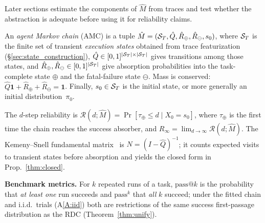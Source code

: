 Later sections estimate the components of $\hat M$ from traces and test
whether the abstraction is adequate before using it for reliability
claims.

\begin{definition}\label{def:amc}
An \emph{agent Markov chain} (AMC) is a tuple
$\hat M=(\mathcal{S}_T,\hat Q,\hat R_\oplus,\hat R_\ominus,s_0)$, where $\mathcal{S}_T$ is
the finite set of transient \emph{execution states} obtained from trace
featurization (\S\ref{sec:state_construction}),
$\hat Q\in[0,1]^{|\mathcal{S}_T|\times|\mathcal{S}_T|}$ gives transitions among those
states, and $\hat R_\oplus,\hat R_\ominus\in[0,1]^{|\mathcal{S}_T|}$ give
absorption probabilities into the task-complete state $\oplus$ and the
fatal-failure state $\ominus$. Mass is conserved:
$\hat Q\mathbf{1}+\hat R_\oplus+\hat R_\ominus=\mathbf{1}$. Finally,
$s_0\in\mathcal{S}_T$ is the initial state, or more generally an initial
distribution~$\pi_0$.
\end{definition}

\begin{definition}[Reliability]\label{def:reliab}
The $d$-step reliability is
$\mathcal R(d;\hat M)=\Pr[\tau_\oplus\le d\mid X_0=s_0]$, where
$\tau_\oplus$ is the first time the chain reaches the success
absorber, and $R_\infty=\lim_{d\to\infty}\mathcal R(d;\hat M)$. The
Kemeny--Snell fundamental matrix~\cite{kemenysnell} is
$N=(I-\hat Q)^{-1}$; it counts expected visits to transient states
before absorption and yields the closed form in
Prop.~\ref{thm:closed}.
\end{definition}

\noindent\textbf{Benchmark metrics.}
For $k$ repeated runs of a task, $\mathrm{pass}@k$ is the probability that
\emph{at least one} run succeeds and $\mathrm{pass}^k$ that \emph{all} $k$
succeed; under the fitted chain and i.i.d.\ trials (A\ref{A:iid}) both are
restrictions of the same success first-passage distribution as the RDC
(Theorem~\ref{thm:unify}).

